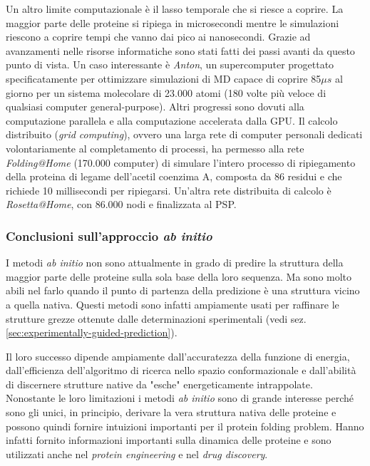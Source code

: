 {{\par Un altro limite computazionale è il lasso temporale che si riesce a coprire. La maggior parte delle proteine si ripiega in microsecondi mentre le simulazioni riescono a coprire tempi che vanno dai pico ai nanosecondi. Grazie ad avanzamenti nelle risorse informatiche sono stati fatti dei passi avanti da questo punto di vista. Un caso interessante è \textit{Anton}, un supercomputer progettato specificatamente per ottimizzare simulazioni di MD capace di coprire 85$\mu s$ al giorno per un sistema molecolare di 23.000 atomi (180 volte più veloce di qualsiasi computer general-purpose). Altri progressi sono dovuti alla computazione parallela e alla computazione accelerata dalla GPU. Il calcolo distribuito (\textit{grid computing}), ovvero una larga rete di computer personali dedicati volontariamente al completamento di processi, ha permesso alla rete \textit{Folding@Home} (170.000 computer) di simulare l'intero processo di ripiegamento della proteina di legame dell'acetil coenzima A, composta da 86 residui e che richiede 10 millisecondi per ripiegarsi. Un'altra rete distribuita di calcolo è \textit{Rosetta@Home}, con 86.000 nodi e finalizzata al PSP. \\

\subsubsection{Conclusioni sull'approccio \textit{ab initio}}
I metodi \textit{ab initio} non sono attualmente in grado di predire la struttura della maggior parte delle proteine sulla sola base della loro sequenza. Ma sono molto abili nel farlo quando il punto di partenza della predizione è una struttura vicino a quella nativa. Questi metodi sono infatti ampiamente usati per raffinare le strutture grezze ottenute dalle determinazioni sperimentali (vedi sez. \ref{sec:experimentally-guided-prediction}). 

\par Il loro successo dipende ampiamente dall'accuratezza della funzione di energia, dall'efficienza dell'algoritmo di ricerca nello spazio conformazionale e dall'abilità di discernere strutture native da "esche" energeticamente intrappolate.
Nonostante le loro limitazioni i metodi \textit{ab initio} sono di grande interesse perché sono gli unici, in principio, derivare la vera struttura nativa delle proteine e possono quindi fornire intuizioni importanti per il protein folding problem. Hanno infatti fornito informazioni importanti sulla dinamica delle proteine e sono utilizzati anche nel \textit{protein engineering} e nel \textit{drug discovery}. 

}}
